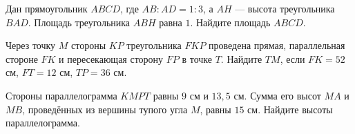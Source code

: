 \begin{class}[number=7]
\begin{listofex}
		\item  Дан прямоугольник \( ABCD \), где \( AB : AD = 1 : 3 \), а \( AH \) --- высота треугольника \( BAD \). Площадь треугольника \( ABH \) равна \( 1 \). Найдите площадь \( ABCD \).
		\item Через точку \( M \) стороны \( KP \) треугольника \( FKP \) проведена прямая,	параллельная стороне \( FK \) и пересекающая сторону \( FP \) в точке \(  T \). Найдите \( TM \), если \( FK=52 \) см, \( FT=12 \) см, \( TP=36 \) см.
		\item  Стороны параллелограмма \( KMPT \) равны \( 9 \) см и \( 13,5 \) см.
		Сумма его высот \( MA \) и \( MB \), проведённых из вершины тупого угла
		\( M \), равны \( 15 \) см. Найдите высоты параллелограмма.
	\end{listofex}
\end{class}

